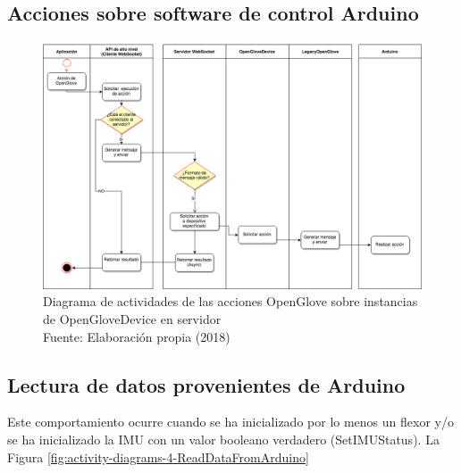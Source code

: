 \subsection{Acciones sobre software de control Arduino}
\begin{figure}[H]
  \begin{center} 
   	\includegraphics[width=1.0\textwidth]{images/chapter04/ActivityDiagrams-OpenGloveActions-3.png} 
   \captionsetup{justification=centering}
    \caption[Diagrama de actividades de las acciones OpenGlove sobre instancias de OpenGloveDevice en servidor]{Diagrama de actividades de las acciones OpenGlove sobre instancias de OpenGloveDevice en servidor\\Fuente: Elaboración propia (2018)}
    \label{fig:activity-diagrams-3-arduino}
  \end{center}
\end{figure}


\subsection{Lectura de datos provenientes de Arduino}
Este comportamiento ocurre cuando se ha inicializado por lo menos un flexor y/o se ha inicializado la IMU con un valor booleano verdadero (SetIMUStatus). La Figura \ref{fig:activity-diagrams-4-ReadDataFromArduino}


